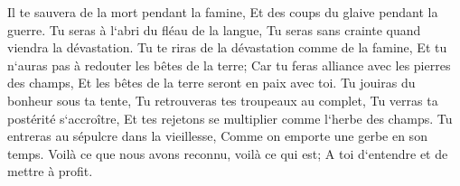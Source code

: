 \verse Il te sauvera de la mort pendant la famine, Et des coups du glaive pendant la guerre. 
\verse Tu seras à l`abri du fléau de la langue, Tu seras sans crainte quand viendra la dévastation. 
\verse Tu te riras de la dévastation comme de la famine, Et tu n`auras pas à redouter les bêtes de la terre; 
\verse Car tu feras alliance avec les pierres des champs, Et les bêtes de la terre seront en paix avec toi. 
\verse Tu jouiras du bonheur sous ta tente, Tu retrouveras tes troupeaux au complet, 
\verse Tu verras ta postérité s`accroître, Et tes rejetons se multiplier comme l`herbe des champs. 
\verse Tu entreras au sépulcre dans la vieillesse, Comme on emporte une gerbe en son temps. 
\verse Voilà ce que nous avons reconnu, voilà ce qui est; A toi d`entendre et de mettre à profit. 

